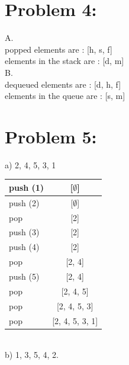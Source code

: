 \documentclass{report}
\begin{document}
    \section*{Problem 4:}
        \huge A.\\ \normalsize
            popped elements are : [h, s, f]\\
            elements in the stack are : [d, m]\\
        \huge B.\\ \normalsize
            dequeued elements are : [d, h, f]\\
            elements in the queue are : [s, m]\\
    \section*{Problem 5:}
        \huge a) \normalsize 2, 4, 5, 3, 1 \\
        \begin{tabular}{| l | c |}
            \hline
            \Large push (1) &\Large [$\emptyset$]\\
            \hline
            \Large push (2) &\Large [$\emptyset$]\\
            \hline
            \Large pop &\Large [2]\\
            \hline
            \Large push (3) &\Large [2]\\
            \hline
            \Large push (4) &\Large [2]\\
            \hline
            \Large pop &\Large [2, 4]\\
            \hline
            \Large push (5) &\Large [2, 4]\\
            \hline
            \Large pop &\Large [2, 4, 5]\\
            \hline
            \Large pop &\Large [2, 4, 5, 3]\\
            \hline
            \Large pop &\Large [2, 4, 5, 3, 1]\\
            \hline
        \end{tabular}\\
        \huge b) \normalsize 1, 3, 5, 4, 2.\\
\end{document}
